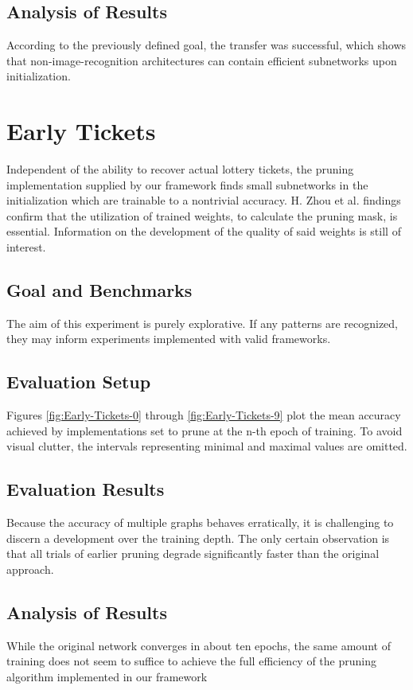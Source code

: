 \subsection*{Analysis of Results}
According to the previously defined goal, the transfer was successful, which shows that non-image-recognition architectures can contain efficient subnetworks upon initialization.

\newpage

\section{Early Tickets}
Independent of the ability to recover actual lottery tickets, the pruning implementation supplied by our framework finds small subnetworks in the initialization which are trainable to a nontrivial accuracy. H. Zhou et al. findings confirm that the utilization of trained weights, to calculate the pruning mask, is essential.\cite{Deconstructing_LTH} Information on the development of the quality of said weights is still of interest. 
\subsection*{Goal and Benchmarks}
The aim of this experiment is purely explorative. If any patterns are recognized, they may inform experiments implemented with valid frameworks.
\subsection*{Evaluation Setup}
Figures \ref{fig:Early-Tickets-0} through \ref{fig:Early-Tickets-9} plot the mean accuracy achieved by implementations set to prune at the n-th epoch of training. To avoid visual clutter, the intervals representing minimal and maximal values are omitted. 
\subsection*{Evaluation Results}
Because the accuracy of multiple graphs behaves erratically, it is challenging to discern a development over the training depth. The only certain observation is that all trials of earlier pruning degrade significantly faster than the original approach.
\subsection*{Analysis of Results}
While the original network converges in about ten epochs, the same amount of training does not seem to suffice to achieve the full efficiency of the pruning algorithm implemented in our framework

